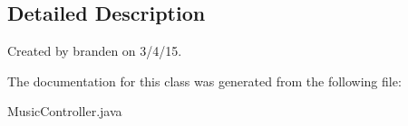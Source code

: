 \subsection{Detailed Description}
Created by branden on 3/4/15. 

The documentation for this class was generated from the following file\+:\begin{DoxyCompactItemize}
\item 
Music\+Controller.\+java\end{DoxyCompactItemize}
